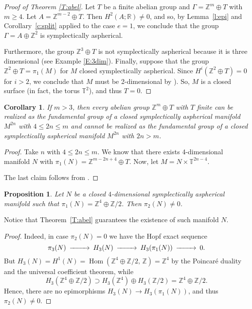 \documentclass[12pt]{amsart}
\newcommand{\B}[1]{{\mathbb #1}}
\newcommand{\Z}{\B Z}
\newcommand{\R}{\B R}
\newcommand{\T}{\B T}
\newtheorem{cory}[subsection]{Corollary}
\newtheorem{prop}[subsection]{Proposition}
\theoremstyle{definition}
\theoremstyle{remark}
\numberwithin{figure}{section}
\numberwithin{table}{section}
\numberwithin{equation}{section}
\newcommand{\Ga}{{\Gamma}}
\newcommand\Hom{\operatorname{Hom}}
\newcommand\lemref{Lemma~\ref}
\newcommand\corref{Corollary~\ref}
\begin{document}
\begin{proof}[Proof of Theorem \ref{T:abel}] 
Let $T$ be a finite abelian group and 
$\Ga=\B Z^m\oplus T$ with $m\ge 4$. 
Let $A= \B Z^{m-2}\oplus T$. 
Then $H^2(A;\R)\ne 0$, and so, by \lemref{l:epi} and 
\corref{c:split} applied to the case 
$e=1$, we conclude that the group 
$\Ga=A\oplus \Z^2$ is symplectically aspherical.

Furthermore, the group $\B Z^3\oplus T$ is not symplectically 
aspherical because it is three dimensional 
(see Example \ref{E:3dim}).
Finally, suppose that the group $\B Z^2\oplus T=\pi_1(M)$ for $M$ closed symplectically 
aspherical. Since $H^i(\B Z^2\oplus T)=0$ for $i>2$, we conclude that
$M$ must be 2-dimensional by \cite[Proposition 2.3]{IKRT}). So, $M$ is a closed surface 
(in fact, the torus $\T^2$), and thus $T=0$. 
\end{proof} 

\begin{cory}\label{cor:dim}
If $m>3$, then every abelian group $\Z^m \oplus T$ with $T$ finite can be 
realized as the fundamental group of a closed symplectically aspherical manifold $M^{2n}$ 
with $4\le 2n \le m$ and cannot be realized as the fundamental group of a closed 
symplectically aspherical manifold $M^{2n}$ with $2n>m$.
\end{cory}


\begin{proof} Take $n$ with $4\le 2n \le m$. We know that there exists 
4-dimensional manifold $N$ with $\pi_1(N)=\Z^{m-2n+4}\oplus T$. Now, let 
$M=N\times \T^{2n-4}$.

The last claim follows from \cite[Proposition 2.3]{IKRT}.
\end{proof}


\begin{prop}\label{prop:pi2}
Let $N$ be a closed $4$-dimensional symplectically aspherical manifold such 
that $\pi_1(N)=\Z^4\oplus \Z/2$. Then $\pi_2(N)\ne 0$.
\end{prop}

Notice that Theorem~\ref{T:abel} guarantees the existence of such manifold $N$.

\begin{proof} Indeed, in case $\pi_2(N)=0$ we have the Hopf exact sequence 
$$
\CD
\pi_3(N) @>>>  H_3(N) @>>>  H_3(\pi_1(N)) @>>> 0.
\endCD
$$
But $H_3(N)=H^1(N)=\Hom (\B Z^4\oplus \Z/2,\, \Z)=\B Z^4$ by the Poincar\'e duality 
and the universal coefficient theorem, while 
$$
H_3(\B Z^4\oplus \Z/2)\supset H_3(\B Z^4) \oplus H_3(\B Z/2)=\B
Z^4\oplus \B Z/2.
$$ 
Hence, there are no epimorphisms $H_3(N) \to  H_3(\pi_1(N))$, and thus
$\pi_2(N)\ne 0$.
\end{proof}
\end{document}
